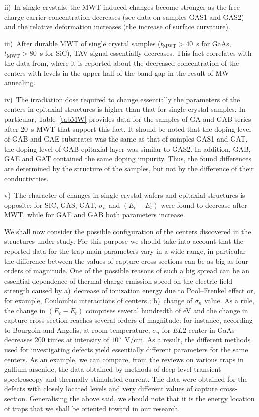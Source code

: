 \documentclass[%
 aip,jap,
 amsmath,amssymb,
 reprint,%
]{revtex4-1}
\begin{document}
\noindent
ii)~In single crystals, the  MWT induced changes become stronger as the free charge carrier concentration decreases
(see data on samples GAS1 and GAS2) and the relative deformation increases (the increase of surface curvature).

\noindent
iii)~After durable MWT of single crystal samples ($t_\mathrm{MWT}>40$~s for GaAs,  $t_\mathrm{MWT}>80$~s for SiC),
TAV signal essentially decreases.
This fact correlates with the data  from,\cite{Belyaev1998JTFEn}
where it is reported about  the decreased concentration of the centers with levels in the upper half of the band gap in the result of MW annealing.

\noindent
iv)~The irradiation dose required to change essentially the parameters of the centers in epitaxial structures is higher than that for single crystal samples.
In particular, Table~\ref{tabMW} provides  data for the samples of GA and GAB series after 20~s MWT
that support this fact.
It should be noted that the doping level of  GAB and GAE substrates was the same as that of samples GAS1 and GAT,
the doping level of GAB epitaxial layer was similar to GAS2.
In addition, GAB, GAE and GAT contained the same doping impurity.
Thus, the found differences are determined by the structure of the samples, but not by the difference of their conductivities.

\noindent
v)~The character of changes in single crystal wafers and epitaxial structures is opposite:
for SIC, GAS, GAT, $\sigma_n$ and $(E_c-E_t)$ were found to decrease after MWT,
while for GAE and GAB both parameters increase.

We shall now consider the possible configuration of the centers discovered in the structures under study.
For this purpose we should take into account that the reported data for the trap main parameters vary in a wide range,
in particular the difference between the values of capture cross-sections can be as big as four orders of magnitude.\cite{Pavlovic2000}
One of the possible reasons of such a big spread can be an essential dependence
of thermal charge emission speed on  the electric field strength\cite{Bulyarskii2000,Makram} caused by
a)~decrease of ionization energy due to Pool--Frenkel effect or, for example, Coulombic interactions of centers \cite{Stellmacher};
b)~change of $\sigma_n$  value.\cite{Bourgoin2001}
As a rule, the change in $(E_c-E_t)$ comprises several hundredth of eV and
the change in capture cross-section reaches several orders of magnitude:
for instance, according to Bourgoin and Angelis\cite{Bourgoin2001}, at room temperature,
$\sigma_n$  for $EL2$ center in GaAs decreases 200 times
at intensity of $10^5$~V/cm.
As a result, the different methods used for investigating defects yield essentially different parameters for the same centers.
As an example, we can compare, from the reviews on various traps in gallium arsenide,
the data  obtained by methods of deep level transient spectroscopy \cite{Bourgoin:GaAs}
and thermally stimulated current.\cite{Pavlovic2000}
The data were obtained for the defects with closely located levels and very different values of capture cross-section.
Generalising the above said, we should note that it is the energy location of traps that we shall be oriented toward in our research.
\end{document}
